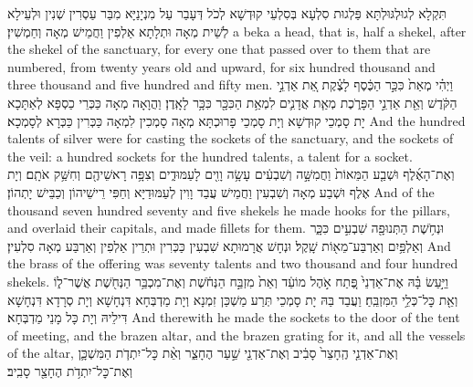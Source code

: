 {תִּקְלָא לְגוּלְגּוּלְתָּא פַּלְגוּת סִלְעָא בְּסִלְעֵי קוּדְשָׁא לְכֹל דְּעָבַר עַל מִנְיָנַיָּא מִבַּר עַסְרִין שְׁנִין וּלְעֵילָא לְשֵׁית מְאָה וּתְלָתָא אַלְפִין וַחֲמֵישׁ מְאָה וְחַמְשִׁין׃}
{a beka a head, that is, half a shekel, after the shekel of the sanctuary, for every one that passed over to them that are numbered, from twenty years old and upward, for six hundred thousand and three thousand and five hundred and fifty men.}{}
{וַיְהִ֗י מְאַת֙ כִּכַּ֣ר הַכֶּ֔סֶף לָצֶ֗קֶת אֵ֚ת אַדְנֵ֣י הַקֹּ֔דֶשׁ וְאֵ֖ת אַדְנֵ֣י הַפָּרֹ֑כֶת מְאַ֧ת אֲדָנִ֛ים לִמְאַ֥ת הַכִּכָּ֖ר כִּכָּ֥ר לָאָֽדֶן׃
}
{וַהֲוָאָה מְאָה כַּכְּרֵי כַסְפָּא לְאַתָּכָא יָת סָמְכֵי קוּדְשָׁא וְיָת סָמְכֵי פָרוּכְתָּא מְאָה סָמְכִין לִמְאָה כַּכְּרִין כַּכְּרָא לְסָמְכָא׃}
{And the hundred talents of silver were for casting the sockets of the sanctuary, and the sockets of the veil: a hundred sockets for the hundred talents, a talent for a socket.}{}
{וְאֶת־הָאֶ֜לֶף וּשְׁבַ֤ע הַמֵּאוֹת֙ וַחֲמִשָּׁ֣ה וְשִׁבְעִ֔ים עָשָׂ֥ה וָוִ֖ים לָעַמּוּדִ֑ים וְצִפָּ֥ה רָאשֵׁיהֶ֖ם וְחִשַּׁ֥ק אֹתָֽם׃
}
{וְיָת אֶלֶף וּשְׁבַע מְאָה וְשִׁבְעִין וַחֲמֵישׁ עֲבַד וָוִין לְעַמּוּדַיָּא וְחַפִּי רֵישֵׁיהוֹן וְכַבֵּישׁ יָתְהוֹן׃}
{And of the thousand seven hundred seventy and five shekels he made hooks for the pillars, and overlaid their capitals, and made fillets for them.}{}
{וּנְחֹ֥שֶׁת הַתְּנוּפָ֖ה שִׁבְעִ֣ים כִּכָּ֑ר וְאַלְפַּ֥יִם וְאַרְבַּע־מֵא֖וֹת שָֽׁקֶל׃}
{וּנְחָשׁ אֲרָמוּתָא שִׁבְעִין כַּכְּרִין וּתְרֵין אַלְפִין וְאַרְבַּע מְאָה סִלְעִין׃}
{And the brass of the offering was seventy talents and two thousand and four hundred shekels.}{}
{וַיַּ֣עַשׂ בָּ֗הּ אֶת־אַדְנֵי֙ פֶּ֚תַח אֹ֣הֶל מוֹעֵ֔ד וְאֵת֙ מִזְבַּ֣ח הַנְּחֹ֔שֶׁת וְאֶת־מִכְבַּ֥ר הַנְּחֹ֖שֶׁת אֲשֶׁר־ל֑וֹ וְאֵ֖ת כׇּל־כְּלֵ֥י הַמִּזְבֵּֽחַ׃}
{וַעֲבַד בַּהּ יָת סָמְכֵי תְּרַע מַשְׁכַּן זִמְנָא וְיָת מַדְבְּחָא דִּנְחָשָׁא וְיָת סְרָדָא דִּנְחָשָׁא דִּילֵיהּ וְיָת כָּל מָנֵי מַדְבְּחָא׃}
{And therewith he made the sockets to the door of the tent of meeting, and the brazen altar, and the brazen grating for it, and all the vessels of the altar,}{}
{וְאֶת־אַדְנֵ֤י הֶֽחָצֵר֙ סָבִ֔יב וְאֶת־אַדְנֵ֖י שַׁ֣עַר הֶחָצֵ֑ר וְאֵ֨ת כׇּל־יִתְדֹ֧ת הַמִּשְׁכָּ֛ן וְאֶת־כׇּל־יִתְדֹ֥ת הֶחָצֵ֖ר סָבִֽיב׃}
